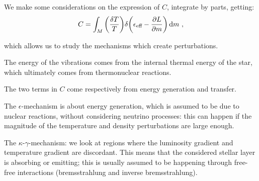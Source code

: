 \documentclass[main.tex]{subfiles}
\begin{document}
We make some considerations on the expression of \(C\), integrate by parts, getting:
%
\begin{equation}
  C = \int_M \qty(\frac{\delta T}{T}) \delta \qty(\epsilon _{\text{eff}}- \pdv{L}{m} ) \dd{m}
\,,
\end{equation}

which allows us to study the mechanisms which create perturbations.

The energy of the vibrations comes from the internal thermal energy of the star, which ultimately comes from thermonuclear reactions.

The two terms in \(C\) come respectively from energy generation and transfer.

The \(\epsilon \)-mechanism is about energy generation, which is assumed to be due to nuclear reactions, without considering neutrino processes:
this can happen if the magnitude of the temperature and density perturbations are large enough.

The \(\kappa \)-\(\gamma \)-mechanism: we look at regions where the luminosity gradient and temperature gradient are discordant. This means that the considered stellar layer is absorbing or emitting; this is usually assumed to be happening through free-free interactions (bremsstrahlung and inverse bremsstrahlung).
\end{document}

